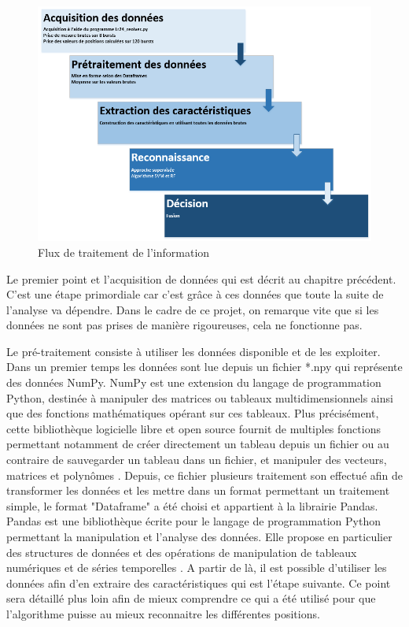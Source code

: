\begin{figure}[H]
	\begin{center}
		\includegraphics[scale=0.6]{figures/processing.png}
		\caption{Flux de traitement de l'information}
		\label{fig:process} %
	\end{center}
\end{figure}

Le premier point et l'acquisition de données qui est décrit au chapitre précédent. C'est une étape primordiale car c'est grâce à ces données que toute la suite de l'analyse va dépendre. Dans le cadre de ce projet, on remarque vite que si les données ne sont pas prises de manière rigoureuses, cela ne fonctionne pas.

Le pré-traitement consiste à utiliser les données disponible et de les exploiter. Dans un premier temps les données sont lue depuis un fichier *.npy qui représente des données NumPy. NumPy est une extension du langage de programmation Python, destinée à manipuler des matrices ou tableaux multidimensionnels ainsi que des fonctions mathématiques opérant sur ces tableaux. Plus précisément, cette bibliothèque logicielle libre et open source fournit de multiples fonctions permettant notamment de créer directement un tableau depuis un fichier ou au contraire de sauvegarder un tableau dans un fichier, et manipuler des vecteurs, matrices et polynômes \cite{WIKI2}. Depuis, ce fichier plusieurs traitement son effectué afin de transformer les données et les mettre dans un format permettant un traitement simple, le format "Dataframe" a été choisi et appartient à la librairie Pandas. Pandas est une bibliothèque écrite pour le langage de programmation Python permettant la manipulation et l'analyse des données. Elle propose en particulier des structures de données et des opérations de manipulation de tableaux numériques et de séries temporelles \cite{WIKI3}. A partir de là, il est possible d'utiliser les données afin d'en extraire des caractéristiques qui est l'étape suivante. Ce point sera détaillé plus loin afin de mieux comprendre ce qui a été utilisé pour que l'algorithme puisse au mieux reconnaitre les différentes positions. 

